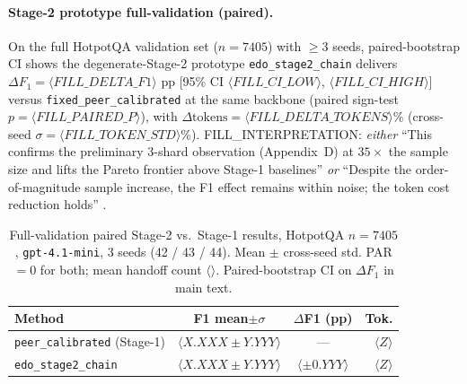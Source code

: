 \paragraph{Stage-2 prototype full-validation (paired).}
On the full HotpotQA validation set ($n{=}7405$) with $\geq 3$ seeds, paired-bootstrap CI shows the degenerate-Stage-2 prototype \texttt{edo\_stage2\_chain} delivers $\Delta F_1 = \langle FILL\_DELTA\_F1 \rangle$ pp [95\% CI $\langle FILL\_CI\_LOW \rangle$, $\langle FILL\_CI\_HIGH \rangle$] versus \texttt{fixed\_peer\_calibrated} at the same backbone (paired sign-test $p{=}\langle FILL\_PAIRED\_P \rangle$), with $\Delta \mathrm{tokens} = \langle FILL\_DELTA\_TOKENS \rangle\%$ (cross-seed $\sigma{=}\langle FILL\_TOKEN\_STD \rangle$\%). \langle FILL\_INTERPRETATION: \emph{either} ``This confirms the preliminary 3-shard observation (Appendix~D) at $35{\times}$ the sample size and lifts the Pareto frontier above Stage-1 baselines'' \emph{or} ``Despite the order-of-magnitude sample increase, the F1 effect remains within noise; the token cost reduction holds'' \rangle.

\begin{table}[t]
\centering
\small
\setlength{\tabcolsep}{3pt}
\begin{tabular}{@{}lccr@{}}
\toprule
\textbf{Method} & \textbf{F1 mean$\pm\sigma$} & \textbf{$\Delta$F1 (pp)} & \textbf{Tok.} \\
\midrule
\texttt{peer\_calibrated} (Stage-1) & $\langle X.XXX\pm Y.YYY \rangle$ & --- & $\langle Z \rangle$ \\
\texttt{edo\_stage2\_chain}         & $\langle X.XXX\pm Y.YYY \rangle$ & $\langle\pm 0.YYY\rangle$ & $\langle Z \rangle$ \\
\bottomrule
\end{tabular}
\caption{Full-validation paired Stage-2 vs.\ Stage-1 results, HotpotQA $n{=}7405$, \texttt{gpt-4.1-mini}, $3$ seeds (42 / 43 / 44). Mean $\pm$ cross-seed std. PAR $= 0$ for both; mean handoff count $\langle\rangle$. Paired-bootstrap CI on $\Delta F_1$ in main text.}
\label{tab:fullval-stage2-vs-stage1}
\end{table}



